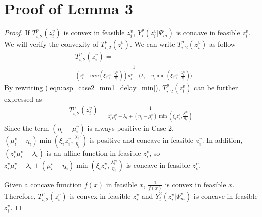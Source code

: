 \documentclass[10pt,journal, compsoc]{IEEEtran}
\begin{document}
  \section{Proof of Lemma 3}\label{appendix:lemma_3}
    \begin{proof}
    If $T_{i,2}^p(z_i^v)$ is convex in feasible $z_i^v$, $Y_i^2(z_i^v|\Psi_m^v)$ is concave in feasible $z_i^v$. We will verify the convexity of $T_{i,2}^p(z_i^v)$. We can write $T_{i,2}^p(z_i^v)$ as follow
    \begin{equation} \label{eqn:asp_case2_mm1_delay_min}
    \begin{aligned}
    &T_{i,2}^p(z_i^v) = \\ &\frac{1}{(z_i^v-min(\xi_i z_i^v, \frac{\lambda_i^m}{\eta_i}))\mu_i^v - \big(\lambda_i - \eta_i\min(\xi_i z_i^v, \frac{\lambda_i^m}{\eta_i})\big)}
    \end{aligned}
    \end{equation}
    By rewriting (\ref{eqn:asp_case2_mm1_delay_min}), $T_{i,2}^p(z_i^v)$ can be further expressed as
    \begin{equation} \label{eqn:asp_case2_mm1_delay_min_new}
    \begin{aligned}
    T_{i,2}^p(z_i^v) = \frac{1}{z_i^v\mu_i^v - \lambda_i +(\eta_i - \mu_i^v)\min(\xi_i z_i^v, \frac{\lambda_i^m}{\eta_i})}
    \end{aligned}
    \end{equation}
    Since the term $(\eta_i - \mu_i^v)$ is always positive in Case 2, $(\mu_i^v - \eta_i)\min(\xi_i z_i^v, \frac{\lambda_i^m}{\eta_i})$ is positive and concave in feasible $z_i^v$. In addition, $(z_i^v\mu_i^v - \lambda_i)$ is an affine function in feasible $z_i^v$, so $z_i^v\mu_i^v - \lambda_i+(\mu_i^v - \eta_i)\min(\xi_i z_i^v, \frac{\lambda_i^m}{\eta_i})$ is concave in feasible $z_i^v$\cite[Chapter~3.2]{boyd2004convex}.
    
    Given a concave function $f(x)$ in feasible $x$, $\frac{1}{f(x)}$ is convex in feasible $x$. Therefore, $T_{i,2}^p(z_i^v)$ is convex in feasible $z_i^v$ and $Y_i^2(z_i^v|\Psi_m^v)$ is concave in feasible $z_i^v$.  \qedhere
    \end{proof}
\end{document}
